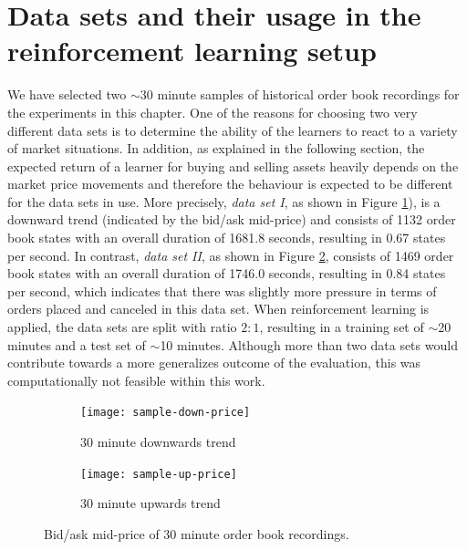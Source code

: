 \section{Data sets and their usage in the reinforcement learning setup}
\label{sec:analysis-data-sets}
We have selected two $\sim$30 minute samples of historical order book recordings for the experiments in this chapter.
One of the reasons for choosing two very different data sets is to determine the ability of the learners to react to a variety of market situations.
In addition, as explained in the following section, the expected return of a learner for buying and selling assets heavily depends on the market price movements and therefore the behaviour is expected to be different for the data sets in use.
More precisely, \textit{data set I}, as shown in Figure \ref{fig:sample-down-price}), is a downward trend (indicated by the bid/ask mid-price) and consists of 1132 order book states with an overall duration of 1681.8 seconds, resulting in 0.67 states per second.
In contrast, \textit{data set II}, as shown in Figure \ref{fig:sample-up-price}, consists of 1469 order book states with an overall duration of 1746.0 seconds, resulting in 0.84 states per second, which indicates that there was slightly more pressure in terms of orders placed and canceled in this data set.
When reinforcement learning is applied, the data sets are split with ratio $2:1$, resulting in a training set of $\sim$20 minutes and a test set of $\sim$10 minutes.
Although more than two data sets would contribute towards a more generalizes outcome of the evaluation, this was computationally not feasible within this work.
\begin{figure}[H]
    \centering
    \begin{subfigure}[b]{0.45\textwidth}
        \texttt{[image: sample-down-price]}
        \caption{30 minute downwards trend}
        \label{fig:sample-down-price}
    \end{subfigure}
    \begin{subfigure}[b]{0.45\textwidth}
        \texttt{[image: sample-up-price]}
        \caption{30 minute upwards trend}
        \label{fig:sample-up-price}
    \end{subfigure}
    \caption{Bid/ask mid-price of 30 minute order book recordings.}
    \label{fig:sample-price}
\end{figure}

